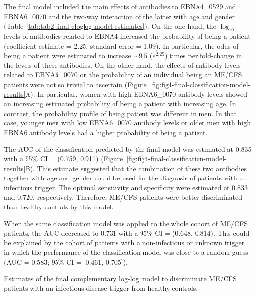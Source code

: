 The final model included the main effects of antibodies to EBNA4\_0529 and EBNA6\_0070 and the two-way interaction of the latter with age and gender (Table~\ref{tab:tab2-final-cloglog-model-estimates}). On the one hand, the $\log_{10}$-levels of antibodies related to EBNA4 increased the probability of being a patient (coefficient estimate = 2.25, standard error = 1.09). In particular, the odds of being a patient were estimated to increase ${\sim}9.5$ ($e^{2.25}$) times per fold-change in the levels of these antibodies. On the other hand, the effects of antibody levels related to EBNA6\_0070 on the probability of an individual being an ME/CFS patients were not so trivial to ascertain (Figure~\ref{fig:fig4-final-classification-model-results}A). In particular, women with high EBNA6\_0070 antibody levels showed an increasing estimated probability of being a patient with increasing age. In contrast, the probability profile of being patient was different in men. In that case, younger men with low EBNA6\_0070 antibody levels or older men with high EBNA6 antibody levels had a higher probability of being a patient.

The AUC of the classification predicted by the final model was estimated at 0.835 with a 95\% CI = (0.759, 0.911) (Figure~\ref{fig:fig4-final-classification-model-results}B). This estimate suggested that the combination of these two antibodies together with age and gender could be used for the diagnosis of patients with an infectious trigger. The optimal sensitivity and specificity were estimated at 0.833 and 0.720, respectively. Therefore, ME/CFS patients were better discriminated than healthy controls by this model.

When the same classification model was applied to the whole cohort of ME/CFS patients, the AUC decreased to 0.731 with a 95\% CI = (0.648, 0.814). This could be explained by the cohort of patients with a non-infectious or unknown trigger in which the performance of the classification model was close to a random guess (AUC = 0.583; 95\% CI = [0.461, 0.705]).

\begin{table}[h]
    \centering
    \caption[Estimates of the final complementary log-log model to discriminate ME/CFS patients with an infectious disease trigger from healthy controls]{Estimates of the final complementary log-log model to discriminate ME/CFS patients with an infectious disease trigger from healthy controls.}
    
    \label{tab:tab2-final-cloglog-model-estimates}
\end{table}

